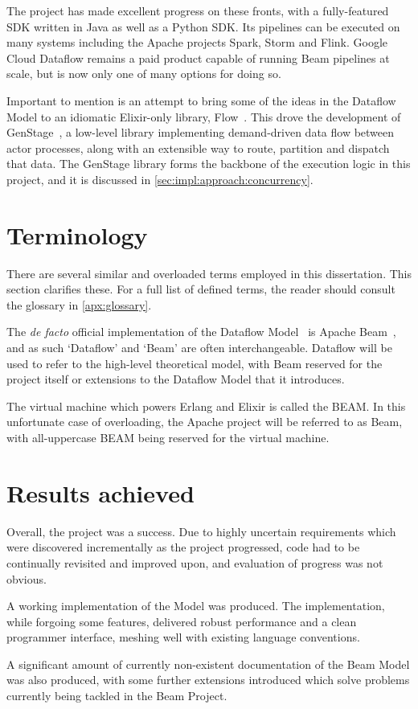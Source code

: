The project has made excellent progress on these fronts, with a fully-featured SDK written in Java as well as a Python SDK.
Its pipelines can be executed on many systems including the Apache projects Spark, Storm and Flink.
Google Cloud Dataflow remains a paid product capable of running Beam pipelines at scale, but is now only one of many options for doing so.

Important to mention is an attempt to bring some of the ideas in the Dataflow Model to an idiomatic Elixir-only library, Flow~\cite{ElixirFlow}.
This drove the development of GenStage~\cite{ElixirGenStage}, a low-level library implementing demand-driven data flow between actor processes, along with an extensible way to route, partition and dispatch that data.
The GenStage library forms the backbone of the execution logic in this project, and it is discussed in \cref{sec:impl:approach:concurrency}.

\section{Terminology}\label{sec:intro:terminology}

There are several similar and overloaded terms employed in this dissertation.
This section clarifies these.
For a full list of defined terms, the reader should consult the glossary in \cref{apx:glossary}.

The \emph{de facto} official implementation of the Dataflow Model~\cite{Akidau:2015} is Apache Beam~\cite{ApacheBeam}, and as such `Dataflow' and `Beam' are often interchangeable.
Dataflow will be used to refer to the high-level theoretical model, with Beam reserved for the project itself or extensions to the Dataflow Model that it introduces.

The virtual machine which powers Erlang and Elixir is called the BEAM.
In this unfortunate case of overloading, the Apache project will be referred to as Beam, with all-uppercase BEAM being reserved for the virtual machine.

\section{Results achieved}\label{sec:intro:results}

Overall, the project was a success.
Due to highly uncertain requirements which were discovered incrementally as the project progressed, code had to be continually revisited and improved upon, and evaluation of progress was not obvious.

A working implementation of the Model was produced.
The implementation, while forgoing some features, delivered robust performance and a clean programmer interface, meshing well with existing language conventions.

A significant amount of currently non-existent documentation of the Beam Model was also produced, with some further extensions introduced which solve problems currently being tackled in the Beam Project.

